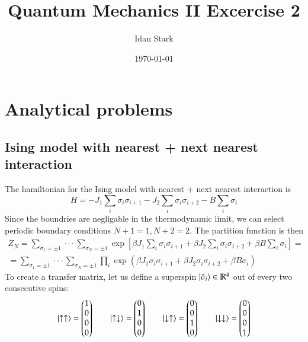 \documentclass{article}
\title{Quantum Mechanics II Excercise 2}
\author{Idan Stark}
\date{\today}
\newcommand{\R}{\ensuremath{\mathbb{R}}}
\begin{document}
\maketitle

\section{Analytical problems}
\subsection{Ising model with nearest + next nearest interaction}
The hamiltonian for the Ising model with nearest + next nearest interaction is
\begin{equation}
    H = -J_1 \sum_i \sigma_i \sigma_{i+1} - J_2 \sum_i \sigma_i \sigma_{i+2} - B \sum_i \sigma_i
\end{equation}
Since the boundries are negligable in the thermodynamic limit, we can select periodic boundary conditions $N + 1 = 1, N + 2 = 2$. The partition function is then
\begin{equation}
\begin{gathered}
    Z_N = \sum_{\sigma_1 = \pm 1} \cdot\cdot\cdot \sum_{\sigma_N = \pm 1}
    \exp\left[\beta J_1 \sum_i \sigma_i \sigma_{i+1} + \beta J_2 \sum_i \sigma_i \sigma_{i+2} + \beta B \sum_i \sigma_i\right] =
    \\
    = \sum_{\sigma_1 = \pm 1} \cdot\cdot\cdot \sum_{\sigma_N = \pm 1}
    \prod_i \exp\left(
        \beta J_1 \sigma_i \sigma_{i+1} +
        \beta J_2 \sigma_i \sigma_{i+2} +
        \beta B \sigma_i
    \right)
\end{gathered}
\end{equation}
To create a transfer matrix, let us define a superspin $\ket{\bar{\sigma}_i} \in \R^4$ out of every two consecutive spins:
\begin{equation}
    \ket{\uparrow \uparrow} = \begin{pmatrix} 1 \\ 0 \\ 0 \\ 0 \end{pmatrix} \qquad
    \ket{\uparrow \downarrow} = \begin{pmatrix} 0 \\ 1 \\ 0 \\ 0 \end{pmatrix} \qquad
    \ket{\downarrow \uparrow} = \begin{pmatrix} 0 \\ 0 \\ 1 \\ 0 \end{pmatrix} \qquad
    \ket{\downarrow \downarrow} = \begin{pmatrix} 0 \\ 0 \\ 0 \\ 1 \end{pmatrix}
\end{equation}
\end{document}
